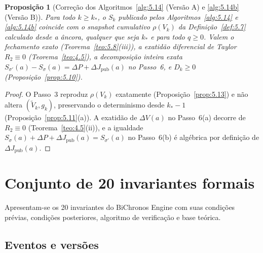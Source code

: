 \documentclass[11pt, a4paper]{article}
\theoremstyle{definition}
\theoremstyle{plain}
\newtheorem{proposicao}[definicao]{Proposição}
\theoremstyle{remark}
\begin{document}
\begin{proposicao}[Correção dos Algoritmos~\ref{alg:5.14} (Versão A) e \ref{alg:5.14b} (Versão B)]\label{prop:5.15}
Para todo $k \ge k_*$, o $S_k$ publicado pelos Algoritmos~\ref{alg:5.14} e \ref{alg:5.14b} coincide com o snapshot cumulativo $\rho(V_k)$ da Definição~\ref{def:5.7} calculado desde a âncora, qualquer que seja $k_*$ e para todo $q \ge 0$. Valem o fechamento exato (Teorema~\ref{teo:5.8}(iii)), a exatidão diferencial de Taylor $R_2 \equiv 0$ (Teorema~\ref{teo:4.5}), a decomposição inteira exata $S_{\sigma'}(a) - S_\sigma(a) = \Delta P + \Delta J_{\text{pub}}(a)$ no Passo~6, e $D_k \ge 0$ (Proposição~\ref{prop:5.10}).
\end{proposicao}
\begin{proof}
O Passo~3 reproduz $\rho(V_k)$ exatamente (Proposição~\ref{prop:5.13}) e não altera $(\tilde{V}_k, g_k)$, preservando o determinismo desde $k_* - 1$ (Proposição~\ref{prop:5.11}(a)). A exatidão de $\Delta V(a)$ no Passo~6(a) decorre de $R_2 \equiv 0$ (Teorema~\ref{teo:4.5}(ii)), e a igualdade $S_\sigma(a) + \Delta P + \Delta J_{\text{pub}}(a) = S_{\sigma'}(a)$ no Passo~6(b) é algébrica por definição de $\Delta J_{\text{pub}}(a)$.
\end{proof}

\section{Conjunto de 20 invariantes formais}\label{sec:6}

Apresentam-se os 20 invariantes do BiChronos Engine com suas condições prévias, condições posteriores, algoritmo de verificação e base teórica.

\subsection{Eventos e versões}
\end{document}
